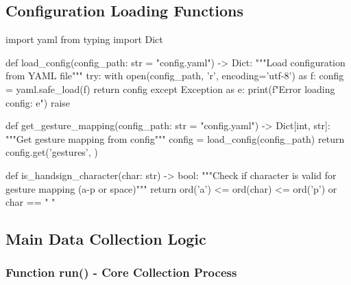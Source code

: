 \subsection{Configuration Loading Functions}

\begin{aivncodebox}
\begin{python}
import yaml
from typing import Dict

def load_config(config_path: str = "config.yaml") -> Dict:
    """Load configuration from YAML file"""
    try:
        with open(config_path, 'r', encoding='utf-8') as f:
            config = yaml.safe_load(f)
        return config
    except Exception as e:
        print(f"Error loading config: {e}")
        raise

def get_gesture_mapping(config_path: str = "config.yaml") -> Dict[int, str]:
    """Get gesture mapping from config"""
    config = load_config(config_path)
    return config.get('gestures', {})

def is_handsign_character(char: str) -> bool:
    """Check if character is valid for gesture mapping (a-p or space)"""
    return ord('a') <= ord(char) <= ord('p') or char == " "
\end{python}
\end{aivncodebox}

\subsection{Main Data Collection Logic}

\subsubsection{Function run() - Core Collection Process}


